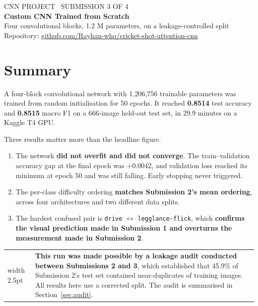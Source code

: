 \documentclass[11pt,a4paper]{article}
\makeatletter
\newenvironment{keybox}
  {\par\medskip\noindent\begin{tabular}{@{}p{0.3em}@{\hspace{0.8em}}p{\dimexpr\linewidth-2.2em}@{}}
   {\color{black}\vrule width 2.5pt} &}
  {\end{tabular}\par\medskip}
\makeatother
\begin{document}
\begin{center}
{\small CNN PROJECT \textbullet\ SUBMISSION 3 OF 4}\\[0.9em]
{\LARGE\bfseries Custom CNN Trained from Scratch}\\[1.0em]
{\large Four convolutional blocks, 1.2 M parameters, on a leakage-controlled split}\\[1.2em]
{\small Repository: \href{https://github.com/Rayhan-who/cricket-shot-attention-cnn}{github.com/Rayhan-who/cricket-shot-attention-cnn}}
\end{center}

\vspace{0.4em}{\hrule height 0.8pt}\vspace{1.0em}

\section*{Summary}

A four-block convolutional network with 1,206,756 trainable parameters was trained from
random initialisation for 50 epochs. It reached \textbf{0.8514} test accuracy and
\textbf{0.8515} macro F1 on a 666-image held-out test set, in 29.9 minutes on a Kaggle
T4 GPU.

Three results matter more than the headline figure.

\begin{enumerate}
\item The network \textbf{did not overfit and did not converge}. The
  train--validation accuracy gap at the final epoch was $+0.0042$, and validation loss
  reached its minimum at epoch 50 and was still falling. Early stopping never triggered.
\item The per-class difficulty ordering \textbf{matches Submission 2's mean ordering},
  across four architectures and two different data splits.
\item The hardest confused pair is \texttt{drive} $\leftrightarrow$
  \texttt{legglance-flick}, which \textbf{confirms the visual prediction made in
  Submission 1 and overturns the measurement made in Submission 2}.
\end{enumerate}

\begin{keybox}
\textbf{This run was made possible by a leakage audit conducted between Submissions 2
and 3}, which established that 45.9\% of Submission 2's test set contained
near-duplicates of training images. All results here use a corrected split. The audit is
summarised in Section~\ref{sec:audit}.
\end{keybox}
\end{document}
